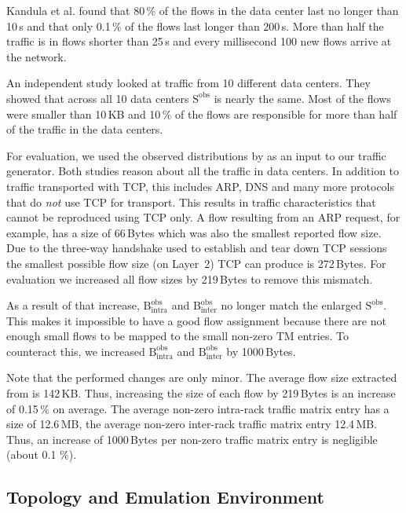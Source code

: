 \documentclass[journal,10pt]{IEEEtran}
\newcommand{\bytes}[2]{\ensuremath{\mathrm{B}^{\mathrm{#1}}_{\mathrm{#2}}}}
\newcommand{\size}[1]{\ensuremath{\mathrm{S}  ^{\mathrm{#1}}}}
\begin{document}
Kandula et al. \cite{MSR-datacenters} found that 80\,\% of the flows in the data center last no longer than 10\,s and that only 0.1\,\% of the flows last longer than 200\,s.
More than half the traffic is in flows shorter than 25\,s and every millisecond 100 new flows arrive at the network.

An independent study \cite{datacentersInTheWild} looked at traffic from 10 different data centers. They
showed that across all 10 data centers \size{obs} is nearly the same. Most of the flows were smaller than 10\,KB and
10\,\% of the flows are responsible for more than half of the traffic in the data centers.

For evaluation, we used the observed distributions by \cite{MSR-datacenters, datacentersInTheWild} as an input to our traffic generator.
Both studies reason about all the traffic in data centers. In addition to traffic transported with TCP, this includes ARP, DNS and many more
protocols that do \emph{not} use TCP for transport.
This results in traffic characteristics that cannot be reproduced using TCP only. 
A flow resulting from an ARP request, for example, has a size of 66\,Bytes which was also the smallest reported flow size.
Due to the three-way handshake used to establish and tear down TCP sessions the smallest possible flow size (on Layer~2) TCP can produce is 272\,Bytes.
For evaluation we increased all flow sizes by 219\,Bytes to remove this mismatch.


As a result of that increase, 
\bytes{obs}{intra} and \bytes{obs}{inter} no longer match the enlarged \size{obs}.
This makes it impossible to have a good flow assignment because there are not enough small flows to be mapped to the small non-zero TM entries.
To counteract this, we increased \bytes{obs}{intra} and \bytes{obs}{inter} by 1000\,Bytes.

Note that the performed changes are only minor.
The average flow size extracted from \cite{datacentersInTheWild} is 142\,KB.
Thus, increasing the size of each flow by 219\,Bytes is an increase of 0.15\,\% on average.
The average non-zero intra-rack traffic matrix entry has a size of 12.6\,MB, the average non-zero inter-rack traffic matrix entry 12.4\,MB.
Thus, an increase of 1000\,Bytes per non-zero traffic matrix entry is negligible (about 0.1 \%).


\subsection{Topology and Emulation Environment}
\end{document}
